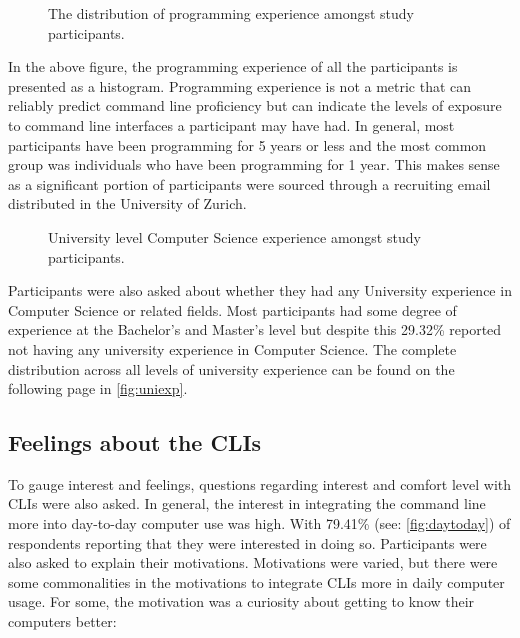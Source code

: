 \begin{figure}[H]
	\centering
	\scalebox{0.75}{}
	\caption{The distribution of programming experience amongst study participants.}
	\label{fig:programmingexp}
\end{figure}

In the above figure, the programming experience of all the participants is
presented as a histogram. Programming experience is not a metric that can
reliably predict command line proficiency but can indicate the levels of
exposure to command line interfaces a participant may have had. In general,
most participants have been programming for 5 years or less and the most common
group was individuals who have been programming for 1 year. This makes sense as
a significant portion of participants were sourced through a recruiting email
distributed in the University of Zurich.

\begin{figure}[h]
	\centering
	\scalebox{0.8}{}
	\caption{University level Computer Science experience amongst study participants.}
	\label{fig:uniexp}
\end{figure}

Participants were also asked about whether they had any University experience
in Computer Science or related fields. Most participants had some degree of
experience at the Bachelor's and Master's level but despite this 29.32\%
reported not having any university experience in Computer Science. The complete
distribution across all levels of university experience can be found on the following page in
\autoref{fig:uniexp}.

\FloatBarrier %


\subsection{Feelings about the CLIs}

To gauge interest and feelings, questions regarding interest and comfort level
with CLIs were also asked. In general, the interest in integrating the command
line more into day-to-day computer use was high. With 79.41\% (see:
\autoref{fig:daytoday}) of respondents reporting that they were interested in
doing so. Participants were also asked to explain their motivations.
Motivations were varied, but there were some commonalities in the motivations
to integrate CLIs more in daily computer usage. For some, the motivation was a
curiosity about getting to know their computers better:

